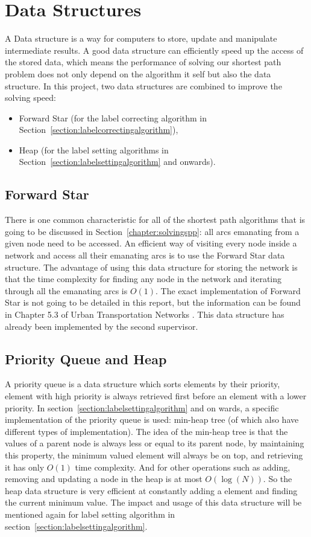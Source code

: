 \section{Data Structures}
A Data structure is a way for computers to store, update and manipulate intermediate results.
A good data structure can efficiently speed up the access of the stored data,
which means the performance of solving our shortest path problem does not only depend on the algorithm it self but also the data structure.
In this project,
two data structures are combined to improve the solving speed:
\begin{itemize}
    \item Forward Star (for the label correcting algorithm in Section~\ref{section:labelcorrectingalgorithm}),
    \item Heap (for the label setting algorithms in Section~\ref{section:labelsettingalgorithm} and onwards).
\end{itemize}
\subsection{Forward Star}\label{chap:forwardstar}
There is one common characteristic for all of the shortest path algorithms that is going to be discussed in Section~\ref{chapter:solvingspp}:
all arcs emanating from a given node need to be accessed.
An efficient way of visiting every node inside a network and access all their emanating arcs is to use the Forward Star data structure.
The advantage of using this data structure for storing the network is that
the time complexity for finding any node in the network and iterating through all the emanating arcs is $O(1)$.
The exact implementation of Forward Star is not going to be detailed in this report,
but the information can be found in Chapter 5.3 of Urban Transportation Networks \citep{Sheffi}.
This data structure has already been implemented by the second supervisor.

\subsection{Priority Queue and Heap}
A priority queue is a data structure which sorts elements by their priority,
element with high priority is always retrieved first before an element with a lower priority.
In section~\ref{section:labelsettingalgorithm} and on wards,
a specific implementation of the priority queue is used:
min-heap tree (of which also have different types of implementation).
The idea of the min-heap tree is that the values of a parent node
is always less or equal to its parent node,
by maintaining this property,
the minimum valued element will always be on top,
and retrieving it has only $O(1)$ time complexity.
And for other operations such as adding, removing and updating a node in the heap is at most $O(\log(N))$.
So the heap data structure is very efficient at constantly adding a element and finding the current minimum value.
The impact and usage of this data structure will be mentioned again for label setting algorithm in section~\ref{section:labelsettingalgorithm}.

